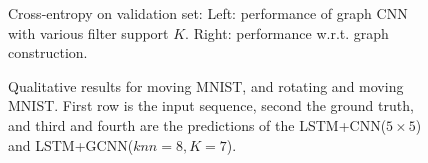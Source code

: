 \documentclass{article}
\begin{document}
\begin{figure}[t]
	\centering
	\hfill
	\caption{Cross-entropy on validation set: Left: performance of graph CNN with various filter support $K$. Right: performance w.r.t. graph construction.}
	\label{fig:mMNIST_graph}
\end{figure}

\begin{figure}[t]
	\centering
	\hfill
	\caption{Qualitative results for moving MNIST, and rotating and moving MNIST. First row is the input sequence, second the ground truth, and third and fourth are the predictions of the LSTM+CNN($5\times5$) and LSTM+GCNN($knn=8, K=7$).}
	\label{fig:mMNIST_img}
\end{figure}
\end{document}

